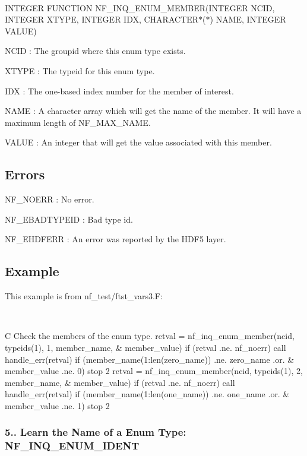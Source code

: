  

I\+N\+T\+E\+G\+ER F\+U\+N\+C\+T\+I\+ON N\+F\+\_\+\+I\+N\+Q\+\_\+\+E\+N\+U\+M\+\_\+\+M\+E\+M\+B\+ER(I\+N\+T\+E\+G\+ER N\+C\+ID, I\+N\+T\+E\+G\+ER X\+T\+Y\+PE, I\+N\+T\+E\+G\+ER I\+DX, C\+H\+A\+R\+A\+C\+T\+E\+R$\ast$($\ast$) N\+A\+ME, I\+N\+T\+E\+G\+ER V\+A\+L\+UE)

{\ttfamily N\+C\+ID} \+: The groupid where this enum type exists.

{\ttfamily X\+T\+Y\+PE} \+: The typeid for this enum type.

{\ttfamily I\+DX} \+: The one-\/based index number for the member of interest.

{\ttfamily N\+A\+ME} \+: A character array which will get the name of the member. It will have a maximum length of N\+F\+\_\+\+M\+A\+X\+\_\+\+N\+A\+ME.

{\ttfamily V\+A\+L\+UE} \+: An integer that will get the value associated with this member.

\subsection*{Errors }

{\ttfamily N\+F\+\_\+\+N\+O\+E\+RR} \+: No error.

{\ttfamily N\+F\+\_\+\+E\+B\+A\+D\+T\+Y\+P\+E\+ID} \+: Bad type id.

{\ttfamily N\+F\+\_\+\+E\+H\+D\+F\+E\+RR} \+: An error was reported by the H\+D\+F5 layer.

\subsection*{Example }

This example is from nf\+\_\+test/ftst\+\_\+vars3.\+F\+:

 

C Check the members of the enum type. retval = nf\+\_\+inq\+\_\+enum\+\_\+member(ncid, typeids(1), 1, member\+\_\+name, \& member\+\_\+value) if (retval .ne. nf\+\_\+noerr) call handle\+\_\+err(retval) if (member\+\_\+name(1\+:len(zero\+\_\+name)) .ne. zero\+\_\+name .or. \& member\+\_\+value .ne. 0) stop 2 retval = nf\+\_\+inq\+\_\+enum\+\_\+member(ncid, typeids(1), 2, member\+\_\+name, \& member\+\_\+value) if (retval .ne. nf\+\_\+noerr) call handle\+\_\+err(retval) if (member\+\_\+name(1\+:len(one\+\_\+name)) .ne. one\+\_\+name .or. \& member\+\_\+value .ne. 1) stop 2

\subsubsection*{5.. Learn the Name of a Enum Type\+: N\+F\+\_\+\+I\+N\+Q\+\_\+\+E\+N\+U\+M\+\_\+\+I\+D\+E\+NT}

